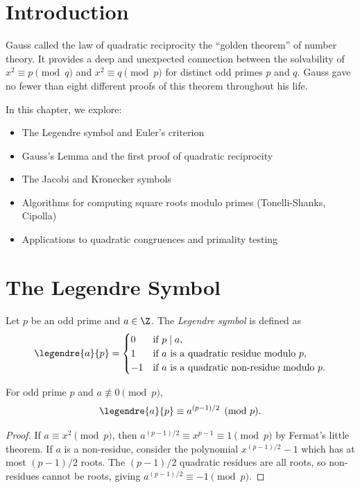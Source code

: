 \section{Introduction}

Gauss called the law of quadratic reciprocity the ``golden theorem'' of number theory. It provides a deep and unexpected connection between the solvability of $x^2 \equiv p \pmod{q}$ and $x^2 \equiv q \pmod{p}$ for distinct odd primes $p$ and $q$. Gauss gave no fewer than eight different proofs of this theorem throughout his life.

In this chapter, we explore:
\begin{itemize}
    \item The Legendre symbol and Euler's criterion
    \item Gauss's Lemma and the first proof of quadratic reciprocity
    \item The Jacobi and Kronecker symbols
    \item Algorithms for computing square roots modulo primes (Tonelli-Shanks, Cipolla)
    \item Applications to quadratic congruences and primality testing
\end{itemize}

\section{The Legendre Symbol}

\begin{definition}
Let $p$ be an odd prime and $a \in \Z$. The \textit{Legendre symbol} is defined as
\[
\legendre{a}{p} = 
\begin{cases}
0 & \text{if } p \mid a, \\
1 & \text{if } a \text{ is a quadratic residue modulo } p, \\
-1 & \text{if } a \text{ is a quadratic non-residue modulo } p.
\end{cases}
\]
\end{definition}

\begin{theorem}
For odd prime $p$ and $a \not\equiv 0 \pmod{p}$,
\[
\legendre{a}{p} \equiv a^{(p-1)/2} \pmod{p}.
\]
\end{theorem}

\begin{proof}
If $a \equiv x^2 \pmod{p}$, then $a^{(p-1)/2} \equiv x^{p-1} \equiv 1 \pmod{p}$ by Fermat's little theorem. If $a$ is a non-residue, consider the polynomial $x^{(p-1)/2} - 1$ which has at most $(p-1)/2$ roots. The $(p-1)/2$ quadratic residues are all roots, so non-residues cannot be roots, giving $a^{(p-1)/2} \equiv -1 \pmod{p}$.
\end{proof}

